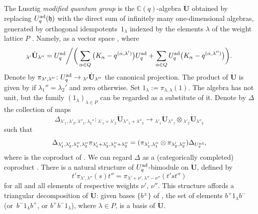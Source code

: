 \documentclass[pdftex]{sigma}
\numberwithin{equation}{section}
\theoremstyle{definition}
\newcommand{\mc}{\mathbb{C}}
\newcommand{\ra}{\rightarrow}
\begin{document}
The Lusztig {\it modified quantum group} is the $\mc(q)$-algebra $\dot{\mathbf{U}}$ obtained by replacing $U_q^{\rm ad}(\mathfrak{h})$ with the direct sum of infinitely many one-dimensional algebras, generated by orthogonal idempotents~$1_\lambda$ indexed by the elements $\lambda$ of the weight lattice $P$ \cite[Chapter~23]{Lusztig}. Namely, as a vector space , where
\[{}_{\lambda'}\dot{\mathbf{U}}{}_{\lambda''} = U_q^{\rm ad}\bigg/\bigg(\sum_{\alpha\in Q} \big(K_\alpha -q^{(\alpha,\lambda')}\big)U_q^{\rm ad}+ \sum_{\alpha\in Q} U_q^{\rm ad}\big(K_\alpha -q^{(\alpha,\lambda'')}\big)\bigg).\]
Denote by $\pi_{\lambda',\lambda''}\colon U_q^{\rm ad} \ra {}_{\lambda'}\dot{\mathbf{U}}{}_{\lambda''}$ the canonical projection. The product of $\dot{\mathbf{U}}$ is given by  if $\lambda_1''=\lambda_2'$ and zero otherwise. Set $1_\lambda := \pi_{\lambda,\lambda}(1)$. The algebra  has not unit, but the family $(1_\lambda)_{\lambda\in P}$ can be regarded as a substitute of it. Denote by $\Delta$ the collection of maps
\[
\Delta_{\lambda'_1,\lambda'_2,\lambda''_1,\lambda_2''} \colon {}_{\lambda'_1+\lambda'_2} \dot{\mathbf{U}} {}_{\lambda''_1+\lambda''_2} \ra {}_{\lambda'_1} \dot{\mathbf{U}} {}_{\lambda''_1}\otimes {}_{\lambda'_2} \dot{\mathbf{U}} {}_{\lambda''_2}
\]
 such that
\begin{equation}\label{defcoprod}
\Delta_{\lambda'_1,\lambda'_2,\lambda''_1,\lambda''_2} \pi_{\lambda'_1+\lambda'_2,\lambda''_1+\lambda''_2} = (\pi_{\lambda'_1,\lambda''_1}\otimes \pi_{\lambda'_2,\lambda''_2})\Delta_{U_q^{\rm ad}},
\end{equation}
where  is the coproduct of . We can regard $\Delta$ as a (categorically completed) coproduct \smash{$\Delta \colon \dot{\mathbf{U}} \ra \dot{\mathbf{U}} {}^{\hat{\otimes}2}$}. There is a natural structure of $U_q^{\rm ad}$-bimodule on $\dot{\mathbf{U}}$, defined by
\begin{equation}\label{bimodstr}
t'\pi_{\lambda',\lambda''}(s)t'' = \pi_{\lambda'+\nu',\lambda''-\nu''}(t'st'')
\end{equation}
for all  and all elements  of respective weights $\nu'$, $\nu''$. This structure affords a triangular decomposition of $\dot{\mathbf{U}}$: given bases $\{b^\pm\}$ of , the set of elements $b^+1_\lambda b^-$ (or~$b^-1_\lambda b^+$, or $b^+b^-1_\lambda$), where $\lambda\in P$, is a basis of $\dot{\mathbf{U}}$.
\end{document}
